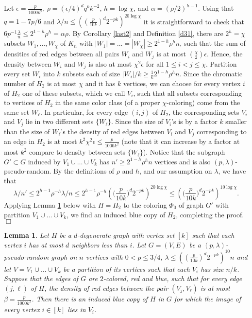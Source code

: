 \documentclass[11pt]{article}
\newtheorem{lemma}[theorem]{Lemma}
\begin{document}
Let $\epsilon= \frac{p}{1000k^6}$,
$\rho=(\epsilon/4)^dq^{k}k^{-2}$, $h=\log \chi $, and
$\alpha=(\rho/2)^{h-1} $. Using that
$q=1-7p/6$ and $\lambda/n \leq ((\frac{p}{10k})^d2^{-pk})^{20\log \chi}$ it is straightforward to check that
$6p^{-1}\frac{\lambda}{n} \leq
2^{1-h}\rho^{h}=\alpha \rho$. By Corollary \ref{last2} and Definition \ref{d31}, there are
$2^h=\chi$ subsets $W_1,\ldots,W_{\chi}$ of $K_n$ with $|W_1|=\ldots=|W_\chi| \geq
2^{1-h}\rho^{h}n$, such that the sum of densities of red edges
between all pairs $W_i$ and $W_j$ is at most ${\chi \choose 2}\epsilon$.
Hence, the density between $W_i$
and $W_j$ is also at most $\chi^2\epsilon$ for all $1 \leq i < j \leq \chi$.
Partition every set $W_i$ into $k$ subsets
each of size $|W_i|/k \geq \frac{1}{k}2^{1-h}\rho^{h}n$.
Since the chromatic number of $H_2$ is at most $\chi$ and it has $k$ vertices, we can
choose for every vertex $i$ of $H_2$ one of these subsets, which we call $V_i$, such that all subsets
corresponding to vertices of $H_2$ in the same color class (of a proper $\chi$-coloring)
come from the same set $W_\ell$.
In particular, for every edge $(i,j)$ of $H_2$, the corresponding sets
$V_i$ and $V_j$ lie in two different sets $\{W_\ell\}$. Since the size of $V_i$'s is by
a factor $k$ smaller than the size
of $W_\ell$'s the density of red edges between $V_i$ and $V_j$
corresponding to an edge in $H_2$ is at most $k^2\chi^2\epsilon \leq
\frac{p}{1000k^2}$ (note that it can increase by a factor at most $k^2$ compare to density between sets $\{W_\ell\}$).
Notice that the subgraph $G' \subset G$ induced by $V_1 \cup \ldots \cup
V_{k}$ has $n' \geq 2^{1-h}\rho^{h}n$ vertices and is also $(p,\lambda)$-pseudo-random.
By the definitions of $\rho$ and $h$, and our assumption on $\lambda$, we have that
$$\lambda/n'\leq 2^{h-1}\rho^{-h}\lambda/n \leq 2^{h-1}\rho^{-h} \left(\Big(\frac{p}{10k}\Big)^d2^{-pk}\right)^{20\log \chi}
\leq   \left(\Big(\frac{p}{10k}\Big)^d2^{-pk}\right)^{10\log \chi}.$$
Applying Lemma \ref{densitylemma} below with $H=H_2$ to the coloring
$\Phi_0$ of graph $G'$ with partition $V_1 \cup \ldots \cup V_{k}$, we find an induced blue copy of $H_2$, completing
the proof. \hfill $\Box$


\begin{lemma}\label{densitylemma}
Let $H$ be a $d$-degenerate graph with vertex set $[k]$ such that
each vertex $i$ has at most $d$ neighbors less than $i$. Let
$G=(V,E)$ be a $(p,\lambda)$-pseudo-random graph on $n$ vertices
with $0<p \leq 3/4$, $\lambda \leq ((\frac{p}{10k})^d2^{-pk})^{10}n$
and let $V=V_1 \cup \ldots \cup V_k$ be a partition of its vertices
such that each $V_i$ has size $n/k$. Suppose that the edges of $G$
are $2$-colored, red and blue, such that for every edge $(j,\ell)$
of $H$, the density of red edges between the pair $(V_j,V_{\ell})$
is at most $\beta = \frac{p}{1000k^2}$. Then there is an induced
blue copy of $H$ in $G$ for which the image of every vertex $i \in
[k]$ lies in $V_i$.
\end{lemma}
\end{document}
